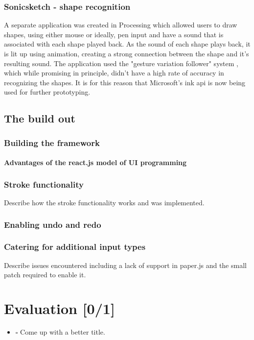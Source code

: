 \documentclass[a4paper,12pt]{article}
\begin{document}
\subsubsection{Sonicsketch - shape recognition}
\label{sec:orga853f5d}
A separate application was created in Processing which allowed users to draw
shapes, using either mouse or ideally, pen input and have a sound that is
associated with each shape played back. As the sound of each shape plays back,
it is lit up using animation, creating a strong connection between the shape and
it's resulting sound. The application used the "gesture variation follower"
system \cite{caramiaux_adaptive_2015}, which while promising in principle, didn't
have a high rate of accuracy in recognizing the shapes. It is for this reason
that Microsoft's ink api is now being used for further prototyping.

\subsection{The build out}
\label{sec:orgdb7c949}
\subsubsection{Building the framework}
\label{sec:org09d7858}
\paragraph{Advantages of the react.js model of UI programming}
\label{sec:org04e4ebc}
\subsubsection{Stroke functionality}
\label{sec:org085eaa7}
Describe how the stroke functionality works and was implemented.
\subsubsection{Enabling undo and redo}
\label{sec:orgcdcc826}
\subsubsection{Catering for additional input types}
\label{sec:orgce0b257}
Describe issues encountered including a lack of support in paper.js and the
small patch required to enable it.

\section{Evaluation [0/1]}
\label{sec:org9ff3665}
\begin{itemize}
\item $\square$ Come up with a better title.
\end{itemize}
\end{document}
